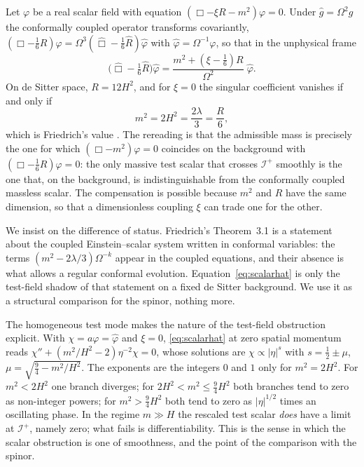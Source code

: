 \documentclass[11pt,a4paper]{article}
\theoremstyle{definition}
\newcommand{\scri}{\mathscr{I}^{+}}
\newcommand{\hg}{\hat g}
\newcommand{\hphi}{\hat\varphi}
\begin{document}
Let $\varphi$ be a real scalar field with equation $(\Box-\xi R-m^{2})\varphi=0$. Under $\hg=\Omega^{2}g$ the conformally coupled operator transforms covariantly, $(\Box-\tfrac16 R)\varphi=\Omega^{3}(\hat\Box-\tfrac16\hat R)\hphi$ with $\hphi=\Omega^{-1}\varphi$, so that in the unphysical frame
\begin{equation}
\Big(\hat\Box-\tfrac16\hat R\Big)\hphi=\frac{m^{2}+(\xi-\tfrac16)R}{\Omega^{2}}\;\hphi .
\label{eq:scalarhat}
\end{equation}
On de Sitter space, $R=12H^{2}$, and for $\xi=0$ the singular coefficient vanishes if and only if
\begin{equation}
m^{2}=2H^{2}=\frac{2\lambda}{3}=\frac{R}{6},
\end{equation}
which is Friedrich's value \cite{Friedrich2014}. The rereading is that the admissible mass is precisely the one for which $(\Box-m^{2})\varphi=0$ coincides on the background with $(\Box-\tfrac16R)\varphi=0$: the only massive test scalar that crosses $\scri$ smoothly is the one that, on the background, is indistinguishable from the conformally coupled massless scalar. The compensation is possible because $m^{2}$ and $R$ have the same dimension, so that a dimensionless coupling $\xi$ can trade one for the other.

We insist on the difference of status. Friedrich's Theorem~3.1 is a statement about the coupled Einstein--scalar system written in conformal variables: the terms $(m^{2}-2\lambda/3)\Omega^{-k}$ appear in the coupled equations, and their absence is what allows a regular conformal evolution. Equation~\eqref{eq:scalarhat} is only the test-field shadow of that statement on a fixed de Sitter background. We use it as a structural comparison for the spinor, nothing more.

The homogeneous test mode makes the nature of the test-field obstruction explicit. With $\chi=a\varphi=\hphi$ and $\xi=0$, \eqref{eq:scalarhat} at zero spatial momentum reads $\chi''+(m^{2}/H^{2}-2)\eta^{-2}\chi=0$, whose solutions are $\chi\propto|\eta|^{s}$ with $s=\tfrac12\pm\mu$, $\mu=\sqrt{\tfrac94-m^{2}/H^{2}}$. The exponents are the integers $0$ and $1$ only for $m^{2}=2H^{2}$. For $m^{2}<2H^{2}$ one branch diverges; for $2H^{2}<m^{2}\le\tfrac94H^{2}$ both branches tend to zero as non-integer powers; for $m^{2}>\tfrac94H^{2}$ both tend to zero as $|\eta|^{1/2}$ times an oscillating phase. In the regime $m\gg H$ the rescaled test scalar \emph{does} have a limit at $\scri$, namely zero; what fails is differentiability. This is the sense in which the scalar obstruction is one of smoothness, and the point of the comparison with the spinor.
\end{document}
